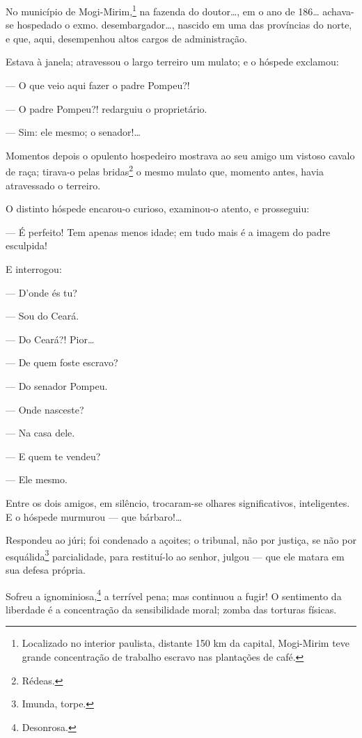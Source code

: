 {\asterisc

No município de Mogi-Mirim,\footnote{Localizado no interior paulista,
  distante 150 km da capital, Mogi-Mirim teve grande concentração de
  trabalho escravo nas plantações de café.} na fazenda do doutor\ldots{}, em
o ano de 186\ldots{} achava-se hospedado o exmo. desembargador\ldots{}, nascido em
uma das províncias do norte, e que, aqui, desempenhou altos cargos de
administração.

Estava à janela; atravessou o largo terreiro um mulato; e o hóspede
exclamou:

--- O que veio aqui fazer o padre Pompeu?!

--- O padre Pompeu?! redarguiu o proprietário.

--- Sim: ele mesmo; o senador!\ldots{}

Momentos depois o opulento hospedeiro mostrava ao seu amigo um vistoso
  cavalo de raça; tirava-o pelas bridas\footnote{Rédeas.} o mesmo
  mulato que, momento antes, havia atravessado o terreiro.

  O distinto hóspede encarou-o curioso, examinou-o atento, e prosseguiu:

--- É perfeito! Tem apenas menos idade; em tudo mais é a imagem do
padre esculpida!

E interrogou:

  --- D'onde és tu?

  --- Sou do Ceará.

  --- Do Ceará?! Pior\ldots{}

  --- De quem foste escravo?

  --- Do senador Pompeu.

  --- Onde nasceste?

  --- Na casa dele.

  --- E quem te vendeu?

  --- Ele mesmo.

  Entre os dois amigos, em silêncio, trocaram-se olhares significativos,
  inteligentes. E o hóspede murmurou --- que bárbaro!\ldots{}

  Respondeu ao júri; foi condenado a açoites; o tribunal, não por
    justiça, se não por esquálida\footnote{Imunda, torpe.} parcialidade,
    para restituí-lo ao senhor, julgou --- que ele matara em sua defesa
    própria.

  Sofreu a ignominiosa,\footnote{Desonrosa.} a terrível pena; mas
  continuou a fugir! O sentimento da liberdade é a concentração da
  sensibilidade moral; zomba das torturas físicas.

}
